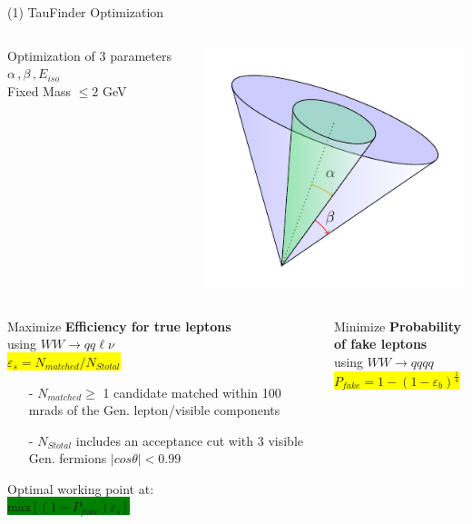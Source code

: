 \documentclass[10pt]{beamer}
\begin{document}
\begin{frame}{(1) TauFinder Optimization}
\begin{columns}
\begin{column}{0.5\textwidth}
Optimization of 3 parameters $\alpha \, , \beta \, , E_{iso}$\\
Fixed Mass $\leq 2$ GeV

\end{column}
\begin{column}{0.5\textwidth}
\includegraphics[scale=0.6]{cone.pdf}
\end{column}
\end{columns}


\begin{columns}
\begin{column}{0.5\textwidth}
Maximize \textbf{Efficiency for true leptons} \\
\scriptsize using $WW\rightarrow qq \ell \nu$ 
\\
\colorbox{yellow}{$\varepsilon_s = N_{matched}/N_{Stotal} $}\\
	\scriptsize
	\begin{itemize}
	\item[-] $N_{matched} \geq$ 1 candidate matched within 100 mrads of the Gen. lepton/visible components\\ 
	\item[-] $N_{Stotal}$ includes an acceptance cut with 3 visible Gen. fermions $|cos\theta |< 0.99$
	\end{itemize}
	\normalsize	
	Optimal working point at:\\
	\quad \quad \quad \colorbox{green}{ max$[(1-P_{fake}) \varepsilon_s]$}
\end{column}
\begin{column}{0.5\textwidth}
Minimize
\textbf{Probability of fake leptons}\\
\scriptsize using $WW \rightarrow qqqq$ \\
\colorbox{yellow}{$P_{fake} = 1-(1 - \varepsilon_b)^{\frac{1}{4} }$}\\


\end{column}
\end{columns}
\end{frame}
\end{document}
